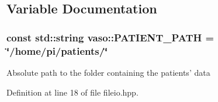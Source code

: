 \subsection{Variable Documentation}
\hypertarget{namespacevaso_a0f49c8240a13e7d853912ad78d5f53c9}{
\subsubsection[{P\+A\+T\+I\+E\+N\+T\+\_\+\+P\+A\+T\+H}]{\setlength{\rightskip}{0pt plus 5cm}const std\+::string vaso\+::\+P\+A\+T\+I\+E\+N\+T\+\_\+\+P\+A\+T\+H = \char`\"{}/home/pi/patients/\char`\"{}}}\label{namespacevaso_a0f49c8240a13e7d853912ad78d5f53c9}
Absolute path to the folder containing the patients' data 

Definition at line 18 of file fileio.\+hpp.

